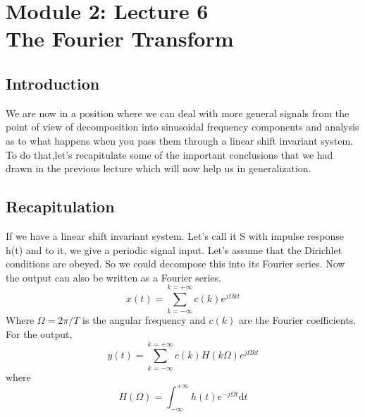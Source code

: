 \section{Module 2: Lecture 6\\The Fourier Transform}

\subsection{Introduction}
We are now in a position where we can deal with more general signals from the point of view of decomposition into sinusoidal frequency components and analysis as to what happens when you pass them through a linear shift invariant system. To do that,let's recapitulate some of the important conclusions that we had drawn in the previous lecture which will now help us in generalization.

\subsection{Recapitulation}
If we have a linear shift invariant system. Let’s call it S with impulse response h(t) and to it, we give a periodic signal input. Let’s assume that the Dirichlet conditions are obeyed. So we could decompose this into its Fourier series. Now the output can also be written as a Fourier series.
\begin{equation*}
x(t)= \sum\limits_{k=-\infty}^{k=+\infty}c(k)e^{j\Omega kt}
\end{equation*}
Where $\Omega=2\pi /T$ is the angular frequency and $c(k)$ are the Fourier coefficients. For the output,
\begin{equation*}
y(t)= \sum\limits_{k=-\infty}^{k=+\infty}c(k)H(k\Omega)e^{j\Omega kt}
\end{equation*}
where
\begin{equation*}
H(\Omega)= \int_{-\infty}^{+\infty}h(t)e^{-j\Omega t}\mathrm{d}t
\end{equation*}
